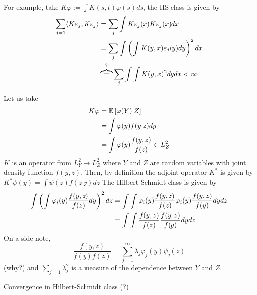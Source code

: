 \begin{example}
    For example, take $K\varphi:=\int K(s,t)\varphi(s)ds$, the HS class is given by \begin{equation*}
        \begin{split}
            \sum_{j=1}\langle K\varepsilon_j,K\varepsilon_j \rangle&=\sum_j \int K\varepsilon_j(x)K\varepsilon_j(x)dx\\
            &= \sum_j \int \left(\int K(y,x)\varepsilon_j(y)dy\right)^2dx\\
            &\overbrace{=}^{?}\sum_j \int \int K(y,x)^2dydx < \infty
        \end{split}
    \end{equation*}
\end{example}

\begin{example}
    Let us take \begin{equation*}
        \begin{split}
            K\varphi&=\mathbb{E}\left[\varphi(Y)|Z \right]\\&=\int \varphi(y)f(y|z)dy \\
            &= \int \varphi(y)\frac{f(y,z)}{f(z)}\in L_Z^2\\
        \end{split}
    \end{equation*} $K$ is an operator from $L_Y^2 \to L_Z^2$ where $Y$ and $Z$ are random variables with joint density function $f(y,z)$.
    Then, by definition the adjoint operator $K^*$ is given by $K^*\psi(y)=\int \psi(z)f(z|y)dz$
    The Hilbert-Schmidt class is given by \begin{equation*}
        \begin{split}
            \int \left(\int \varphi_i(y)\frac{f(y,z)}{f(z)}dy\right)^2dz&= \int \int \varphi_i(y)\frac{f(y,z)}{f(z)}\varphi_i(y)\frac{f(y,z)}{f(y)}dy dz\\&= \int \int \frac{f(y,z)}{f(z)}\frac{f(y,z)}{f(y)}dy dz
        \end{split}
    \end{equation*}
    On a side note, $$\frac{f(y,z)}{f(y)f(z)}=\sum_{j=1}^{\infty} \lambda_j \varphi_j(y)\psi_j(z)$$ {\color{red} (why?)} and $\sum_{j=1}\lambda_j^2$ is a measure of the dependence between $Y$ and $Z$.
\end{example}
Convergence in Hilbert-Schmidt class (?)

